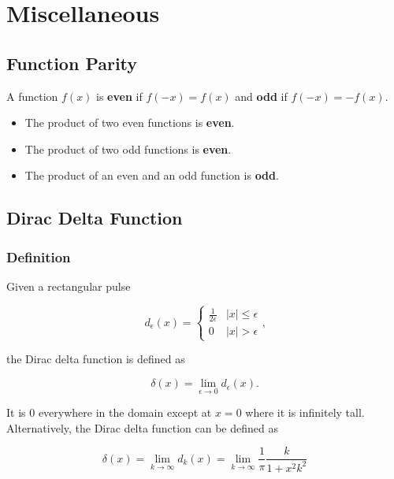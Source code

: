 \section{Miscellaneous}

\subsection{Function Parity}

A function $f(x)$ is \textbf{even} if $f(-x) = f(x)$ and \textbf{odd} if $f(-x) = -f(x)$.

\begin{itemize}
    \item The product of two even functions is \textbf{even}.
    \item The product of two odd functions is \textbf{even}.
    \item The product of an even and an odd function is \textbf{odd}.
\end{itemize}

\subsection{Dirac Delta Function}

\subsubsection{Definition}

Given a rectangular pulse

\begin{equation*}
    d_\epsilon(x) = \begin{cases}
        \frac{1}{2\epsilon} & |x| \le \epsilon \\
        0                   & |x| > \epsilon
    \end{cases}\text{,}
\end{equation*}

the Dirac delta function is defined as

\begin{equation*}
    \delta(x) = \lim_{\epsilon \to 0} d_\epsilon(x)\text{.}
\end{equation*}

It is 0 everywhere in the domain except at $x = 0$ where it is infinitely tall. Alternatively, the Dirac delta function can be defined as

\begin{equation*}
    \delta(x) = \lim_{k \to \infty} d_k(x) = \lim_{k \to \infty} \frac{1}{\pi} \frac{k}{1 + x^2 k^2}
\end{equation*}

